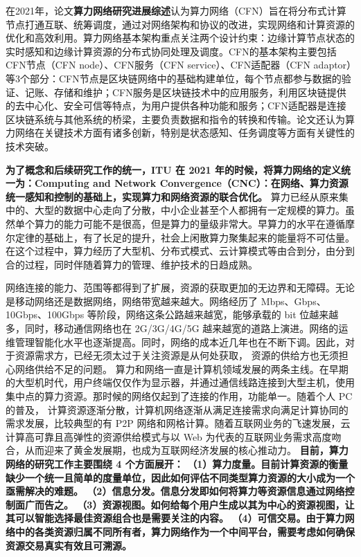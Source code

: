 \documentclass[a4paper,twoside]{scrbook}
\begin{document}
在2021年，论文\textbf{算力网络研究进展综述}认为算力网络（CFN）旨在将分布式计算节点打通互联、统筹调度，通过对网络架构和协议的改进，实现网络和计算资源的优化和高效利用。算力网络基本架构重点关注两个设计约束：边缘计算节点状态的实时感知和边缘计算资源的分布式协同处理及调度。CFN的基本架构主要包括CFN节点（CFN node）、CFN服务（CFN service）、CFN适配器（CFN adaptor）等3个部分：CFN节点是区块链网络中的基础构建单位，每个节点都参与数据的验证、记账、存储和维护；CFN服务是区块链技术中的应用服务，利用区块链提供的去中心化、安全可信等特点，为用户提供各种功能和服务；CFN适配器是连接区块链系统与其他系统的桥梁，主要负责数据和指令的转换和传输。论文还认为算力网络在关键技术方面有诸多创新，特别是状态感知、任务调度等方面有关键性的技术突破。

\textbf{为了概念和后续研究工作的统一，ITU 在 2021 年的时候，将算力网络的定义统一为：Computing and Network Convergence（CNC）：在网络、算力资源统一感知和控制的基础上，实现算力和网络资源的联合优化。}
算力已经从原来集中的、大型的数据中心走向了分散，中小企业甚至个人都拥有一定规模的算力。虽然单个算力的能力可能不是很高，但是算力的量级非常大。早算力的水平在遵循摩尔定律的基础上，有了长足的提升，社会上闲散算力聚集起来的能量将不可估量。在这个过程中，算力经历了大型机、分布式模式、云计算模式等由合到分，由分到合的过程，同时伴随着算力的管理、维护技术的日趋成熟。

网络连接的能力、范围等都得到了扩展，资源的获取更加的无边界和无障碍。无论是移动网络还是数据网络，网络带宽越来越大。网络经历了 Mbps、Gbps、10Gbps、100Gbps 等阶段，网络这条公路越来越宽，能够承载的 bit 位越来越多，同时，移动通信网络也在 2G/3G/4G/5G 越来越宽的道路上演进。网络的运维管理智能化水平也逐渐提高。同时，网络的成本近几年也在不断下调。因此，对于资源需求方，已经无须太过于关注资源是从何处获取，
资源的供给方也无须担心网络供给不足的问题。
算力和网络一直是计算机领域发展的两条主线。在早期的大型机时代，用户终端仅仅作为显示器，并通过通信线路连接到大型主机，使用集中点的算力资源。那时候的网络仅起到了连接的作用，功能单一。随着个人 PC 的普及，
计算资源逐渐分散，计算机网络逐渐从满足连接需求向满足计算协同的需求发展，比较典型的有 P2P 网络和网格计算。随着互联网业务的飞速发展，云计算高可靠且高弹性的资源供给模式与以 Web 为代表的互联网业务需求高度吻合，从而迎来了黄金发展期，也成为互联网经济发展的核心推动力。
\textbf{目前，算力网络的研究工作主要围绕 4 个方面展开：
（1）算力度量。目前计算资源的衡量缺少一个统一且简单的度量单位，因此如何评估不同类型算力资源的大小成为一个亟需解决的难题。
（2）信息分发。信息分发即如何将算力等资源信息通过网络控制面广而告之。
（3）资源视图。如何给每个用户生成以其为中心的资源视图，让其可以智能选择最佳资源组合也是需要关注的内容。
（4）可信交易。由于算力网络中的各类资源归属不同所有者，算力网络作为一个中间平台，需要考虑如何确保资源交易真实有效且可溯源。}
\end{document}

